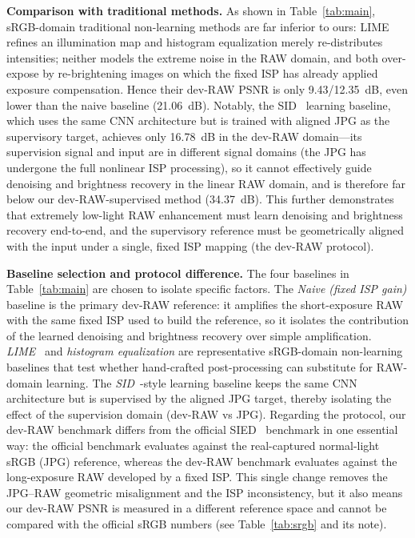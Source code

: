 \documentclass[remotesensing,article,accept,moreauthors]{Definitions/mdpi}
\begin{document}
\textbf{Comparison with traditional methods.} As shown in Table~\ref{tab:main}, sRGB-domain traditional non-learning methods are far inferior to ours: LIME~\citep{guo2017lime} refines an illumination map and histogram equalization merely re-distributes intensities; neither models the extreme noise in the RAW domain, and both over-expose by re-brightening images on which the fixed ISP has already applied exposure compensation. Hence their dev-RAW PSNR is only 9.43/12.35~dB, even lower than the naive baseline (21.06~dB). Notably, the SID~\citep{chen2018sid} learning baseline, which uses the same CNN architecture but is trained with aligned JPG as the supervisory target, achieves only 16.78~dB in the dev-RAW domain---its supervision signal and input are in different signal domains (the JPG has undergone the full nonlinear ISP processing), so it cannot effectively guide denoising and brightness recovery in the linear RAW domain, and is therefore far below our dev-RAW-supervised method (34.37~dB). This further demonstrates that extremely low-light RAW enhancement must learn denoising and brightness recovery end-to-end, and the supervisory reference must be geometrically aligned with the input under a single, fixed ISP mapping (the dev-RAW protocol).

\textbf{Baseline selection and protocol difference.} The four baselines in Table~\ref{tab:main} are chosen to isolate specific factors. The \emph{Naive (fixed ISP gain)} baseline is the primary dev-RAW reference: it amplifies the short-exposure RAW with the same fixed ISP used to build the reference, so it isolates the contribution of the learned denoising and brightness recovery over simple amplification. \emph{LIME}~\citep{guo2017lime} and \emph{histogram equalization} are representative sRGB-domain non-learning baselines that test whether hand-crafted post-processing can substitute for RAW-domain learning. The \emph{SID}~\citep{chen2018sid}-style learning baseline keeps the same CNN architecture but is supervised by the aligned JPG target, thereby isolating the effect of the supervision domain (dev-RAW vs JPG). Regarding the protocol, our dev-RAW benchmark differs from the official SIED~\citep{jiang2025sied} benchmark in one essential way: the official benchmark evaluates against the real-captured normal-light sRGB (JPG) reference, whereas the dev-RAW benchmark evaluates against the long-exposure RAW developed by a fixed ISP. This single change removes the JPG--RAW geometric misalignment and the ISP inconsistency, but it also means our dev-RAW PSNR is measured in a different reference space and cannot be compared with the official sRGB numbers (see Table~\ref{tab:srgb} and its note).
\end{document}
